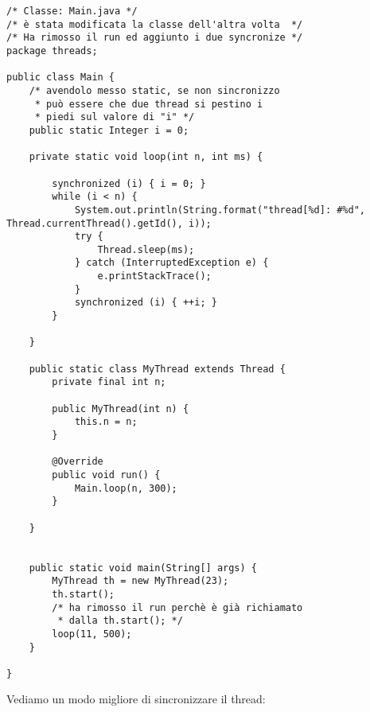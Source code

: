 \begin{lstlisting}[basicstyle=\small,]
/* Classe: Main.java */
/* è stata modificata la classe dell'altra volta  */
/* Ha rimosso il run ed aggiunto i due syncronize */
package threads;

public class Main {
	/* avendolo messo static, se non sincronizzo
	 * può essere che due thread si pestino i
	 * piedi sul valore di "i" */ 
    public static Integer i = 0;

    private static void loop(int n, int ms) {

        synchronized (i) { i = 0; }
        while (i < n) {
            System.out.println(String.format("thread[%d]: #%d", Thread.currentThread().getId(), i));
            try {
                Thread.sleep(ms);
            } catch (InterruptedException e) {
                e.printStackTrace();
            }
            synchronized (i) { ++i; }
        }

    }

    public static class MyThread extends Thread {
        private final int n;

        public MyThread(int n) {
            this.n = n;
        }

        @Override
        public void run() {
            Main.loop(n, 300);
        }

    }


    public static void main(String[] args) {
        MyThread th = new MyThread(23);
        th.start();
        /* ha rimosso il run perchè è già richiamato
         * dalla th.start(); */
        loop(11, 500);
    }

}
\end{lstlisting}

\noindent Vediamo un modo migliore di sincronizzare il thread:

